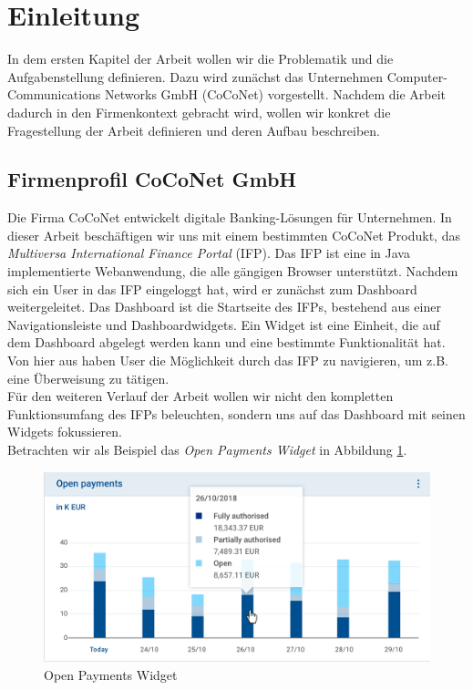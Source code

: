 \section{Einleitung}\raggedbottom
\label{sec:Einleutung}
In dem ersten Kapitel der Arbeit wollen wir die Problematik und die Aufgabenstellung definieren. Dazu wird zunächst das Unternehmen Computer-Communications Networks GmbH (CoCoNet) vorgestellt. Nachdem die Arbeit dadurch in den Firmenkontext gebracht wird, wollen wir konkret die Fragestellung der Arbeit definieren und deren Aufbau beschreiben.
\subsection{Firmenprofil CoCoNet GmbH}
\label{sub:Firmenprofil CoCoNet GmbH}
Die Firma CoCoNet entwickelt digitale Banking-Lösungen für Unternehmen. In dieser Arbeit beschäftigen wir uns mit einem bestimmten CoCoNet Produkt, das \textit{Multiversa International Finance Portal} (IFP). Das IFP ist eine in Java implementierte Webanwendung, die alle gängigen Browser unterstützt. Nachdem sich ein User in das IFP eingeloggt hat, wird er zunächst zum Dashboard weitergeleitet. Das Dashboard ist die Startseite des \mbox{IFPs}, bestehend aus einer Navigationsleiste und Dashboardwidgets. Ein Widget ist eine Einheit, die auf dem Dashboard abgelegt werden kann und eine bestimmte Funktionalität hat. Von hier aus haben User die Möglichkeit durch das IFP zu navigieren, um z.B. eine Überweisung zu tätigen. \citep{CoCo20} \\
Für den weiteren Verlauf der Arbeit wollen wir nicht den kompletten Funktionsumfang des IFPs beleuchten, sondern uns auf das Dashboard mit seinen Widgets fokussieren.\\
Betrachten wir als Beispiel das \textit{Open Payments Widget} in Abbildung \ref{fig:open_payments}. 
\begin{figure}[htb]
\begin{center}
	\includegraphics[width=400pt]{bilder/openPayments.png}
\end{center}
\caption{Open Payments Widget}
\label{fig:open_payments}
\end{figure}

